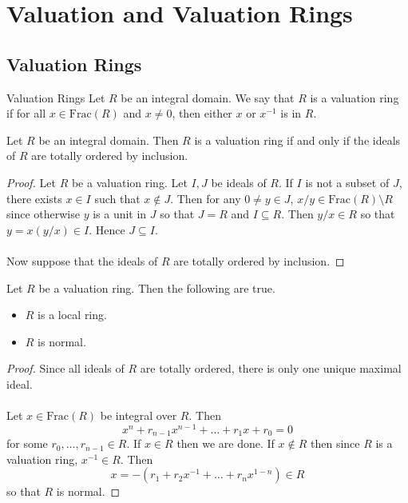 \documentclass[a4paper]{article}
\begin{document}
\pagebreak
\section{Valuation and Valuation Rings}
\subsection{Valuation Rings}
\begin{defn}{Valuation Rings}{} Let $R$ be an integral domain. We say that $R$ is a valuation ring if for all $x\in\text{Frac}(R)$ and $x\neq 0$, then either $x$ or $x^{-1}$ is in $R$. 
\end{defn}

\begin{lmm}{}{} Let $R$ be an integral domain. Then $R$ is a valuation ring if and only if the ideals of $R$ are totally ordered by inclusion. \tcbline
\begin{proof}
Let $R$ be a valuation ring. Let $I,J$ be ideals of $R$. If $I$ is not a subset of $J$, there exists $x\in I$ such that $x\notin J$. Then for any $0\neq y\in J$, $x/y\in\text{Frac}(R)\setminus R$ since otherwise $y$ is a unit in $J$ so that $J=R$ and $I\subseteq R$. Then $y/x\in R$ so that $y=x(y/x)\in I$. Hence $J\subseteq I$. \\~\\

Now suppose that the ideals of $R$ are totally ordered by inclusion. 
\end{proof}
\end{lmm}

\begin{lmm}{}{} Let $R$ be a valuation ring. Then the following are true. 
\begin{itemize}
\item $R$ is a local ring. 
\item $R$ is normal. 
\end{itemize} \tcbline
\begin{proof}
Since all ideals of $R$ are totally ordered, there is only one unique maximal ideal. \\~\\

Let $x\in\text{Frac}(R)$ be integral over $R$. Then $$x^n+r_{n-1}x^{n-1}+\dots+r_1x+r_0=0$$ for some $r_0,\dots,r_{n-1}\in R$. If $x\in R$ then we are done. If $x\notin R$ then since $R$ is a valuation ring, $x^{-1}\in R$. Then $$x=-(r_1+r_2x^{-1}+\dots+r_nx^{1-n})\in R$$ so that $R$ is normal. 
\end{proof}
\end{lmm}
\end{document}
